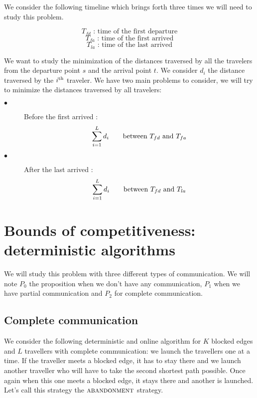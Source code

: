 \documentclass[a4paper, 10pt]{article}
\newcommand{\ith}[1]{#1^{\mbox{\scriptsize{th}}}}
\begin{document}
We consider the following timeline which brings forth three times we will need to study this problem.
\begin{center}
\end{center}
\[
T_{fd} \mbox{\ : time of the first departure}
\]
\[
T_{fa} \mbox{\ : time of the first arrived}
\]
\[
T_{la} \mbox{\ : time of the last arrived}
\]

We want to study the minimization of the distances traversed by all the travelers from the departure point $s$ and the arrival point $t$. We consider $d_i$ the distance traversed by the $\ith{i}$ traveler. We have two main problems to consider, we will try to minimize the distances traversed by all travelers:
\begin{description}
\item[$\bullet$] Before the first arrived :
\[ 
\sum_{i=1}^{L} d_{i} \mbox{\qquad between } T_{fd} \mbox{\ and } T_{fa}
\]
\item[$\bullet$] After the last arrived :
\[ 
\sum_{i=1}^{L} d_{i} \mbox{\qquad between } T_{fd} \mbox{\ and } T_{la}
\]
\end{description}



\section{Bounds of competitiveness: deterministic algorithms}

We will study this problem with three different types of communication. We will note $P_0$ the proposition when we don't have any communication, $P_1$ when we have partial communication and $P_2$ for complete communication.

\subsection{Complete communication}

We consider the following deterministic and online algorithm for $K$ blocked edges and $L$ travellers with complete communication: we launch the travellers one at a time. If the traveller meets a blocked edge, it has to stay there and we launch another traveller who will have to take the second shortest path possible. Once again when this one meets a blocked edge, it stays there and another is launched. Let's call this strategy the $\textsc{abandonment}$ strategy.
\end{document}
